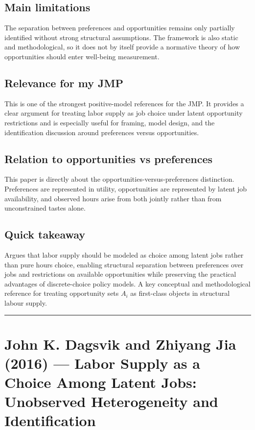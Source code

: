 \documentclass[11pt,a4paper]{article}
\begin{document}
\subsection*{Main limitations}
The separation between preferences and opportunities remains only partially identified without strong structural assumptions. The framework is also static and methodological, so it does not by itself provide a normative theory of how opportunities should enter well-being measurement.

\subsection*{Relevance for my JMP}
This is one of the strongest positive-model references for the JMP. It provides a clear argument for treating labor supply as job choice under latent opportunity restrictions and is especially useful for framing, model design, and the identification discussion around preferences versus opportunities.

\subsection*{Relation to opportunities vs preferences}
This paper is directly about the opportunities-versus-preferences distinction. Preferences are represented in utility, opportunities are represented by latent job availability, and observed hours arise from both jointly rather than from unconstrained tastes alone.

\subsection*{Quick takeaway}
Argues that labor supply should be modeled as choice among latent jobs rather than pure hours choice, enabling structural separation between preferences over jobs and restrictions on available opportunities while preserving the practical advantages of discrete-choice policy models. A key conceptual and methodological reference for treating opportunity sets $A_i$ as first-class objects in structural labour supply.

\medskip\hrule\medskip

\section*{John K. Dagsvik and Zhiyang Jia (2016) — Labor Supply as a Choice Among Latent Jobs: Unobserved Heterogeneity and Identification}
\end{document}
